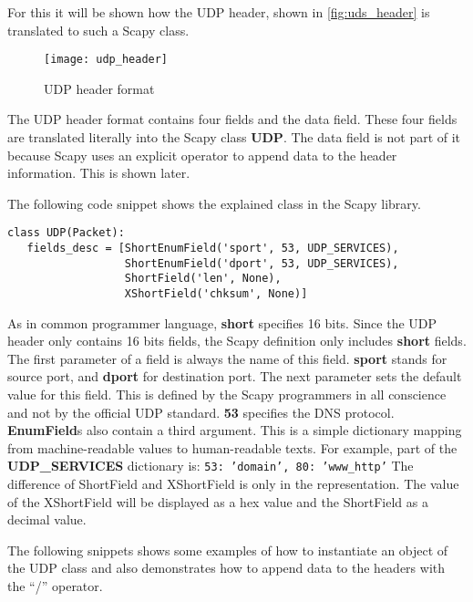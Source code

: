 For this it will be shown how the UDP header, shown in \autoref{fig:uds_header} is translated to such a Scapy class.

\begin{figure}[h]
    \centering
    \texttt{[image: udp\_header]}
    \caption{UDP header format \cite{udp_header}}
    \label{fig:uds_header}
\end{figure}

The UDP header format contains four fields and the data field. These four fields are translated literally into the Scapy class \textbf{UDP}. The data field is not part of it because Scapy uses an explicit operator to append data to the header information. This is shown later.

The following code snippet shows the explained class in the Scapy library.

\begin{samepage}
\begin{verbatim}
class UDP(Packet):
   fields_desc = [ShortEnumField('sport', 53, UDP_SERVICES),
                  ShortEnumField('dport', 53, UDP_SERVICES),
                  ShortField('len', None),
                  XShortField('chksum', None)]
\end{verbatim}
\end{samepage}

As in common programmer language, \textbf{short} specifies 16 bits. Since the UDP header only contains 16 bits fields, the Scapy definition only includes \textbf{short} fields. The first parameter of a field is always the name of this field. \textbf{sport} stands for source port, and \textbf{dport} for destination port.
The next parameter sets the default value for this field. This is defined by the Scapy programmers in all conscience and not by the official UDP standard. \textbf{53} specifies the DNS protocol.
\textbf{EnumField}s also contain a third argument. This is a simple dictionary mapping from machine-readable values to human-readable texts. For example, part of the \textbf{UDP\_SERVICES} dictionary is: \texttt{{53: 'domain', 80: 'www_http'}}
The difference of ShortField and XShortField is only in the representation. The value of the XShortField will be displayed as a hex value and the ShortField as a decimal value.

The following snippets shows some examples of how to instantiate an object of the UDP class and also demonstrates how to append data to the headers with the “/” operator.

